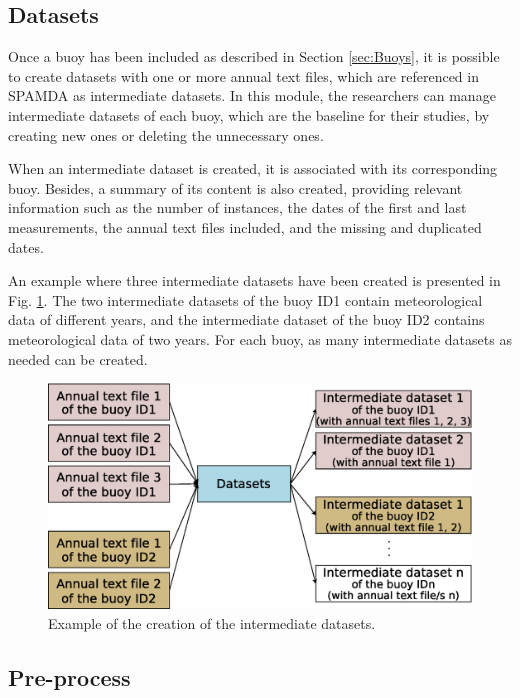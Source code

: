 \documentclass[energies,article,submit,moreauthors,pdftex]{Definitions/mdpi}
\begin{document}
			\subsection{Datasets}\label{sec:Datasets}
			
				Once a buoy has been included as described in Section \ref{sec:Buoys}, it is possible to create datasets with one or more annual text files, which are referenced in SPAMDA as intermediate datasets. In this module, the researchers can manage intermediate datasets of each buoy, which are the baseline for their studies, by creating new ones or deleting the unnecessary ones.
				
				When an intermediate dataset is created, it is associated with its corresponding buoy. Besides, a summary of its content is also created, providing relevant information such as the number of instances, the dates of the first and last measurements, the annual text files included, and the missing and duplicated dates.
				
				An example where three intermediate datasets have been created is presented in Fig. \ref{fig:datasets}. The two intermediate datasets of the buoy ID1 contain meteorological data of different years, and the intermediate dataset of the buoy ID2 contains meteorological data of two years. For each buoy, as many intermediate datasets as needed can be created.
				
				\begin{figure}[ht!]
					\centering
					\includegraphics[scale=0.40]{figures/FigureDatasets.eps}
					\caption{Example of the creation of the intermediate datasets.}
					\label{fig:datasets}
				\end{figure}
				
				
			\subsection{Pre-process} \label{sec:Preprocess}
				
\end{document}
